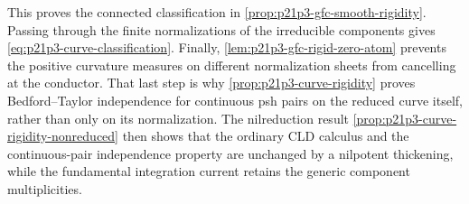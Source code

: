 This proves the connected classification in
\cref{prop:p21p3-gfc-smooth-rigidity}.  Passing through the finite
normalizations of the irreducible components gives
\eqref{eq:p21p3-curve-classification}.  Finally,
\cref{lem:p21p3-gfc-rigid-zero-atom} prevents the positive curvature
measures on different normalization sheets from cancelling at the
conductor.  That last step is why
\cref{prop:p21p3-curve-rigidity} proves Bedford--Taylor independence for
continuous psh pairs on the reduced curve itself, rather than only on its
normalization.  The nilreduction result
\cref{prop:p21p3-curve-rigidity-nonreduced} then shows that the ordinary
CLD calculus and the continuous-pair independence property are unchanged by
a nilpotent thickening, while the fundamental integration current retains
the generic component multiplicities.
